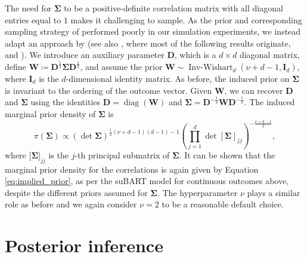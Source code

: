 \documentclass[aoas,preprint]{imsart}
\theoremstyle{plain}
\theoremstyle{definition}
\theoremstyle{remark}
\begin{document}
The need for $\boldsymbol{\Sigma}$ to be a positive-definite correlation matrix with all diagonal entries equal to $1$ makes it challenging to sample.
As the prior and corresponding sampling strategy  
of \citet{chib1998analysis} performed poorly in our simulation experiments, we instead adapt an approach by \citet{zhang2020parameter} (see also \citet{barnard2000modeling}, where most of the following results originate, and \citet{zhang2006sampling}). We introduce an auxiliary parameter $\mathbf{D}$, which is a $d \times d$ diagonal matrix, define $\mathbf{W} \coloneqq \mathbf{D}^{\frac{1}{2}} \boldsymbol{\Sigma} \mathbf{D}^{\frac{1}{2}}$, and assume the prior $\mathbf{W} \sim \operatorname{Inv-Wishart}_d (\nu + d - 1, \mathbf{I}_d)$, where $\mathbf{I}_d$ is the $d$-dimensional identity matrix. As before, the induced prior on $\boldsymbol{\Sigma}$ is invariant to the ordering of the outcome vector. Given $\mathbf{W}$, we can recover $\mathbf{D}$ and $\boldsymbol{\Sigma}$ using the identities $\mathbf{D} = \operatorname{diag}(\mathbf{W})$ and $\boldsymbol{\Sigma}=  \mathbf{D}^{-\frac{1}{2}} \mathbf{W} \mathbf{D}^{-\frac{1}{2}}$. The induced marginal prior density of $\boldsymbol{\Sigma}$ is 
\[
\pi\left(\boldsymbol{\Sigma}\right) \propto \left(\det \boldsymbol{\Sigma}\right)^{\frac{1}{2}(\nu+d-1)(d-1)-1} \left(\prod_{j=1}^{d} \det \left\lbrack\boldsymbol{\Sigma}\right\rbrack_{jj} \right)^{-\frac{\nu + d - 1}{2}},
\]
where $\lbrack\boldsymbol{\Sigma}\rbrack_{jj}$ is the $j$-th principal submatrix of $\boldsymbol{\Sigma}$. It can be shown that the marginal prior density for the correlations is again given by Equation \eqref{eq:implied_prior}, as per the suBART model for continuous outcomes above, despite the different priors assumed for $\boldsymbol{\Sigma}$. The hyperparameter $\nu$ plays a similar role as before and we again consider $\nu=2$ to be a reasonable default choice.

\section{Posterior inference}\label{sec:posterior}
\end{document}
